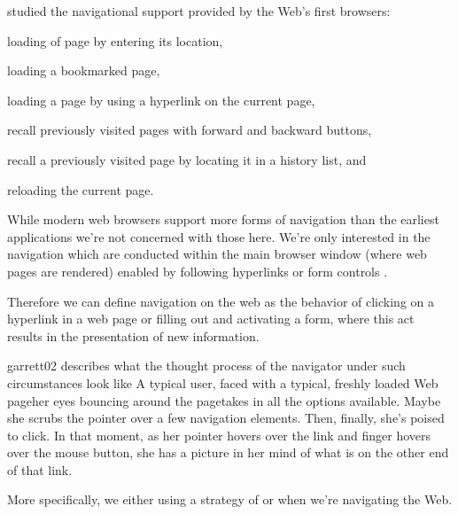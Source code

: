 \citet{jones96} studied the navigational support provided by the Web's first
browsers:
\begin{inparaenum}[(i)]
  \item loading of page by entering its location,
  \item loading a bookmarked page,
  \item loading a page by using a hyperlink on the current page,
  \item recall previously visited pages with forward and backward buttons,
  \item recall a previously visited page by locating it in a history list, and
  \item reloading the current page.
\end{inparaenum}
While modern web browsers support more forms of navigation%
than the earliest applications we're not concerned with those here.
We're only interested in the navigation which are conducted within the main
browser window (where web pages are rendered) enabled by following hyperlinks
or form controls%
.

Therefore we can define navigation on the web as the behavior of clicking on
a hyperlink in a web page or filling out and activating a form, where this
act results in the presentation of new information.
\begin{fullquote}{garrett02}{%
  describes what the thought process of the navigator under
  such circumstances look like}
    A typical user, faced with a typical, freshly loaded Web page\dash{}her
    eyes bouncing around the page\dash{}takes in all the options available.
    Maybe she scrubs the pointer over a few navigation elements. Then,
    finally, she's poised to click. In that moment, as her pointer hovers over
    the link and finger hovers over the mouse button, she has a picture in her
    mind of what is on the other end of that link.
\end{fullquote}

More specifically, we either using a strategy of  or
 when we're navigating the Web.

